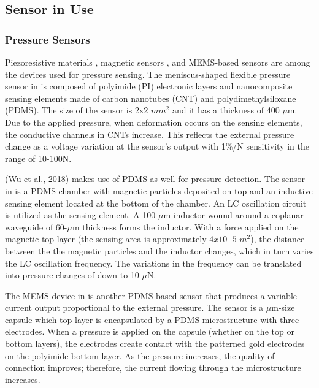 \subsection{Sensor in Use}
\subsubsection{Pressure Sensors}

Piezoresistive materials \parencite{sun_development_2020}, magnetic sensors \parencite{wu_skin-inspired_2018}, and MEMS-based sensors \parencite{fan_polymer_2019} are among the devices used for pressure sensing. The meniscus-shaped flexible pressure sensor in \textcite{sun_development_2020} is composed of polyimide (PI) electronic layers and nanocomposite sensing elements made of carbon nanotubes (CNT) and polydimethylsiloxane (PDMS). The size of the sensor is 2x2 $mm^2$ and it has a thickness of 400 $\mu$m. Due to the applied pressure, when deformation occurs on the sensing elements, the conductive channels  in CNTs increase. This reflects the external pressure change as a voltage variation at the sensor's output with 1\%/N sensitivity in the range of 10-100N.  

(Wu et al., 2018) makes use of PDMS as well for pressure detection. The sensor in \textcite{wu_skin-inspired_2018} is a PDMS chamber with magnetic particles deposited on top and an inductive sensing element located at the bottom of the chamber. An LC oscillation circuit is utilized as the sensing element. A 100-$\mu$m inductor wound around a coplanar waveguide of 60-$\mu$m thickness forms the inductor. With a force applied on the magnetic top layer (the sensing area is approximately $4x10^-5$ $m^2$), the distance between the the magnetic particles and the inductor changes, which in turn varies the LC oscillation frequency. The variations in the frequency can be translated into pressure changes of down to 10 $\mu$N. 

The MEMS device in \textcite{fan_polymer_2019} is another PDMS-based sensor that produces a variable current output proportional to the external pressure. The sensor is a $\mu$m-size capsule which top layer is encapsulated by a PDMS microstructure with three electrodes. When a pressure is applied on the capsule (whether on the top or bottom layers), the electrodes create contact with the patterned gold electrodes on the polyimide bottom layer. As the pressure increases, the quality of connection improves; therefore, the current flowing through the microstructure increases.

